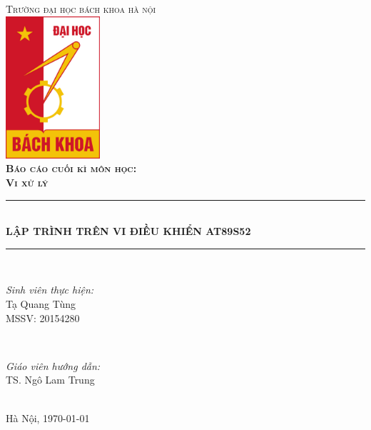 \documentclass[../report.tex]{subfiles}
\begin{document}
\begin{titlepage}

\newcommand{\HRule}{\rule{\linewidth}{0.5mm}} %
\center
 
\textsc{\LARGE Trường đại học bách khoa hà nội}\\[1cm] %
\includegraphics[width=3.5cm]{figures/hust.jpg}\\[1cm] %
 
\textsc{\LARGE\bfseries Báo cáo cuối kì môn học:} \\[0.2cm]
\textsc{\huge\bfseries Vi xử lý}\\[1cm] %

\HRule \\[0.4cm]
{\LARGE\bfseries LẬP TRÌNH TRÊN VI ĐIỀU KHIỂN AT89S52}\\[0.3cm] %
\HRule \\[1.5cm]

\begin{minipage}{0.4\textwidth}
\begin{flushleft} \large
\emph{Sinh viên thực hiện:}\\
Tạ Quang Tùng \\ 
MSSV: 20154280
\end{flushleft}
\end{minipage}
~
\begin{minipage}{0.4\textwidth}
\begin{flushright} \large
\emph{Giáo viên hướng dẫn:} \\
TS. Ngô Lam Trung
\end{flushright}
\end{minipage}\\[5cm]

{\large Hà Nội, \today}\\[1cm] %

\vfill %

\end{titlepage}
\end{document}
